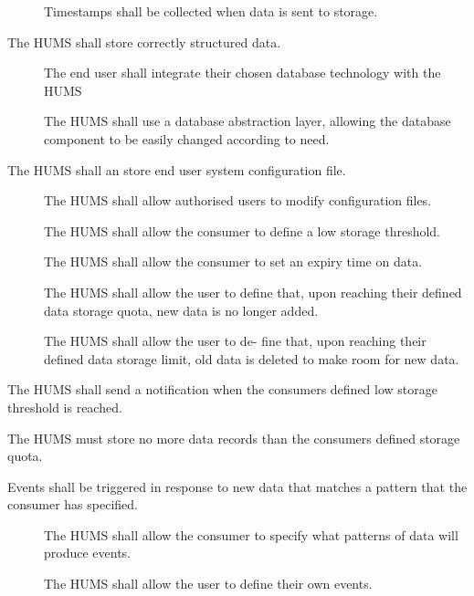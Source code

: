 \begin{description}[leftmargin=1.3cm, itemsep=0.3cm]
\begin{description}
 		 \item[] Timestamps shall be collected when data is sent 			to storage.
	\end{description}
	 \item[\fr{3}] The HUMS shall store correctly structured data.
	 \begin{description}
	 	\item[] The end user shall integrate their chosen database 		technology with the HUMS
	 	\item[] The HUMS shall use a database abstraction layer, 		allowing the database component to be easily changed according to 		need.
	  \end{description}
	 \item[\fr{4}] The HUMS shall an store end user system configuration 	file.
	 \begin{description}
	  	\item[] The HUMS shall allow authorised users to modify
 		configuration files. 
		 \item[] The HUMS shall allow the consumer to define a 			low storage threshold.
		  \item[] The HUMS shall allow the consumer to set an expiry 		time on data.
		  \item[]  The HUMS shall allow the user to define that, 			upon reaching their defined data storage quota, new data is no 			longer added.
		 \item[] The HUMS shall allow the user to de- fine that, upon 		reaching their defined data storage limit, old data is deleted to make 		room for new data.
	\end{description}
	 \item[\fr{5}] The HUMS shall send a notification when the consumers 	defined low storage threshold is reached.
	  \item[\fr{6}] The HUMS must store no more data records than the 		consumers defined storage quota.
	\item[\fr{7}]Events shall be triggered in response to new data that 		matches a pattern that the consumer has specified.
	  \begin{description}
	  
		 \item[]  The HUMS shall allow the consumer to specify what 		 patterns of data will produce events.
		  
		 \item[] The HUMS shall allow the user to define their
 		own events.
		

\end{description}
\end{description}
